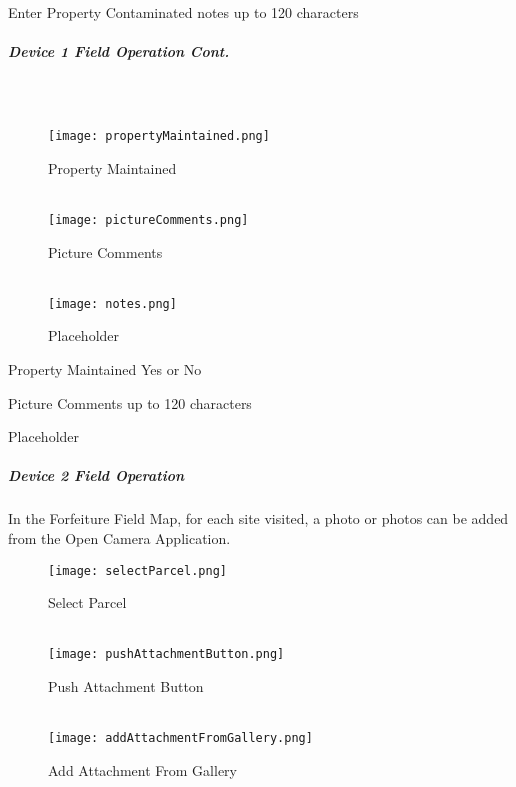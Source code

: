 \documentclass[class=article , crop=false, titlepage, twoside, multi={itemize, figure, verbatim}, float=false]{standalone}
\begin{document}
\noindent Enter Property Contaminated notes up to 120 characters\\

\clearpage
\subparagraph*{Device 1 Field Operation Cont.}
\subparagraph*{\\}
\begin{wrapfigure}{r}{0.5\textwidth}
\centering
\texttt{[image: propertyMaintained.png]}
\caption {Property Maintained}
\vspace{.15in}
\HRule \\[.4cm] %
\vspace{.2in}
\texttt{[image: pictureComments.png]}
\caption{Picture Comments}
\vspace{.15in}
\HRule \\[.4cm] %
\vspace{.2in}
\texttt{[image: notes.png]}
\caption{Placeholder}
\end{wrapfigure}
Property Maintained Yes or No\\
\vspace{2in}

\noindent Picture Comments up to 120 characters\\
\vspace{2in}

\noindent Placeholder\\

\clearpage
\subparagraph{Device 2 Field Operation}In the Forfeiture Field Map, for each site visited, a photo or photos can be added from the Open Camera Application.

\begin{wrapfigure}{r}{0.5\textwidth}
\centering
\texttt{[image: selectParcel.png]}
\caption {Select Parcel}
\vspace{.15in}
\HRule \\[.4cm] %
\vspace{.15in}
\texttt{[image: pushAttachmentButton.png]}
\caption{Push Attachment Button}
\vspace{.15in}
\HRule \\[.4cm] %
\vspace{.15in}
\texttt{[image: addAttachmentFromGallery.png]}
\caption{Add Attachment From Gallery}
\end{wrapfigure}
\vspace{.5in}
\end{document}

